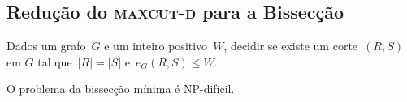 	\bigskip


\subsection{Redução do \textbf{\textsc{maxcut-d}} para a Bissecção}
	\begin{prob}
		Dados um grafo~${G}$
		e um inteiro positivo~${W}$, decidir se existe um
		corte~$(R,S)$ em $G$ tal 
		que~$|R|=|S|$ e~${e_G(R,S)\le W}$.
		
	\end{prob}
	\begin{teo}
		O problema da bissecção mínima é NP-difícil.
	\end{teo}
